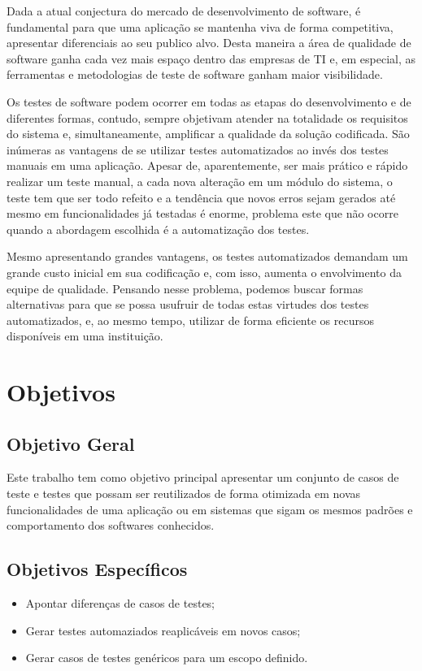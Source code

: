 \documentclass[12pt]{article}
\begin{document}
	Dada a atual conjectura do mercado de desenvolvimento de software, é fundamental para
	que uma aplicação se mantenha viva de forma competitiva, apresentar diferenciais ao seu publico alvo. Desta
	maneira a área de qualidade de software ganha cada vez mais espaço dentro das empresas de TI e, em especial, as ferramentas e
	metodologias de teste de software ganham maior visibilidade.
	
	Os testes de software podem ocorrer em todas as etapas do desenvolvimento e de diferentes formas, contudo,
	sempre objetivam atender na totalidade os requisitos do sistema e, simultaneamente, amplificar a qualidade da solução
	codificada. São inúmeras as vantagens de se utilizar testes automatizados ao invés dos testes manuais em uma aplicação.
	Apesar de, aparentemente, ser mais prático e rápido realizar um teste manual, a cada nova alteração em um módulo do sistema,
	o teste tem que ser todo refeito e a tendência que novos erros sejam gerados até mesmo em funcionalidades já testadas é enorme,
	problema este que não ocorre quando a abordagem escolhida é a automatização dos testes.
	
	Mesmo apresentando grandes vantagens, os testes automatizados demandam um grande custo inicial em sua codificação e, com isso, aumenta o 
	envolvimento da equipe de qualidade. Pensando nesse problema, podemos buscar formas alternativas para
	que se possa usufruir de todas estas virtudes dos testes automatizados, e, ao mesmo tempo, utilizar de forma eficiente os
	recursos disponíveis em uma instituição.
	
	\section{Objetivos}
	
	\subsection{Objetivo Geral}
	
	Este trabalho tem como objetivo principal apresentar um conjunto de casos de teste e testes que possam ser reutilizados de
	forma otimizada em novas funcionalidades de uma aplicação ou em sistemas que sigam os mesmos padrões e comportamento dos
	softwares conhecidos.
	
	\subsection{Objetivos Específicos}
	\begin{itemize}
		\item Apontar diferenças de casos de testes;
		\item Gerar testes automaziados reaplicáveis em novos casos;
		\item Gerar casos de testes genéricos para um escopo definido.
	\end{itemize}
	
\end{document}
